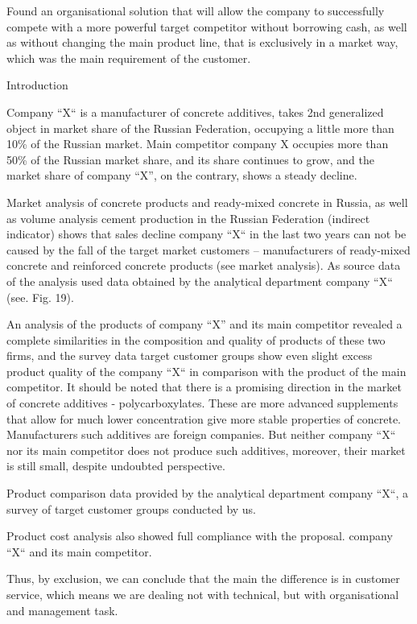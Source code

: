 \documentclass[11pt,a4paper]{book}
\begin{document}
Found an organisational solution that will allow the company to successfully
compete with a more powerful target competitor without borrowing cash, as well
as without changing the main product line, that is exclusively in a market
way, which was the main requirement of the customer.

Introduction

Company “X“ is a manufacturer of concrete additives, takes 2nd generalized object in market
share of the Russian Federation, occupying a little more than 10\% of the
Russian market. Main competitor company X occupies more than 50\% of the
Russian market share, and its share continues to grow, and the market share of
company “X”, on the contrary, shows a steady decline.

Market analysis of concrete products and ready-mixed concrete in Russia, as
well as volume analysis cement production in the Russian Federation (indirect
indicator) shows that sales decline company “X“ in the last two years can not
be caused by the fall of the target market customers -- manufacturers of
ready-mixed concrete and reinforced concrete products (see market analysis).
As source data of the analysis used data obtained by the analytical department
company “X“ (see. Fig. 19).

An analysis of the products of company “X” and its main competitor revealed a
complete similarities in the composition and quality of products of these two
firms, and the survey data target customer groups show even slight excess
product quality of the company “X“ in comparison with the product of the main
competitor.  It should be noted that there is a promising direction in the
market of concrete additives - polycarboxylates. These are more advanced
supplements that allow for much lower concentration give more stable
properties of concrete. Manufacturers such additives are foreign companies.
But neither company “X“ nor its main competitor does not produce such
additives, moreover, their market is still small, despite undoubted
perspective.

Product comparison data provided by the analytical department company “X“, a
survey of target customer groups conducted by us.

Product cost analysis also showed full compliance with the proposal.  company
“X“ and its main competitor.

Thus, by exclusion, we can conclude that the main the difference is in
customer service, which means we are dealing not with technical, but with
organisational and management task.
\end{document}
